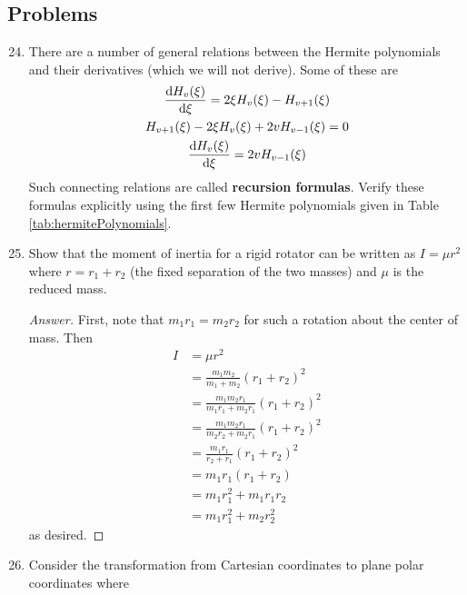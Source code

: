 \documentclass[../notes.tex]{subfiles}
\begin{document}
\subsection*{Problems}
\begin{enumerate}[label={\textbf{5-\arabic*.}},ref={5-\arabic*}]
    \setcounter{enumi}{23}
    \item \label{prb:5-24}There are a number of general relations between the Hermite polynomials and their derivatives (which we will not derive). Some of these are
    \begin{gather*}
        \dv{H_v(\xi)}{\xi} = 2\xi H_v(\xi)-H_{v+1}(\xi)\\
        H_{v+1}(\xi)-2\xi H_v(\xi)+2vH_{v-1}(\xi) = 0\\
        \dv{H_v(\xi)}{\xi} = 2vH_{v-1}(\xi)
    \end{gather*}
    Such connecting relations are called \textbf{recursion formulas}. Verify these formulas explicitly using the first few Hermite polynomials given in Table \ref{tab:hermitePolynomials}.
    \setcounter{enumi}{28}
    \item \label{prb:5-29}Show that the moment of inertia for a rigid rotator can be written as $I=\mu r^2$ where $r=r_1+r_2$ (the fixed separation of the two masses) and $\mu$ is the reduced mass.
    \begin{proof}[Answer]
        First, note that $m_1r_1=m_2r_2$ for such a rotation about the center of mass. Then
        \begingroup
        \allowdisplaybreaks
        \begin{align*}
            I &= \mu r^2\\
            &= \frac{m_1m_2}{m_1+m_2}(r_1+r_2)^2\\
            &= \frac{m_1m_2r_1}{m_1r_1+m_2r_1}(r_1+r_2)^2\\
            &= \frac{m_1m_2r_1}{m_2r_2+m_2r_1}(r_1+r_2)^2\\
            &= \frac{m_1r_1}{r_2+r_1}(r_1+r_2)^2\\
            &= m_1r_1(r_1+r_2)\\
            &= m_1r_1^2+m_1r_1r_2\\
            &= m_1r_1^2+m_2r_2^2
        \end{align*}
        \endgroup
        as desired.
    \end{proof}
    \item \label{prb:5-30}Consider the transformation from Cartesian coordinates to plane polar coordinates where
    \begin{align*}

\end{align*}
\end{enumerate}
\end{document}
